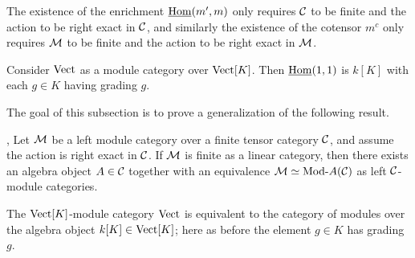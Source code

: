 \documentclass{amsart}
\begin{document}
\begin{remark} \label{rem-enrich}
	The existence of the enrichment $\operatorname{\underline{Hom}}(m', m)$ only requires $\mathcal C$ to be finite and the action to be right exact in $\mathcal C$, and similarly the existence of the cotensor $m^c$ only requires $\mathcal M$ to be finite and the action to be right exact in $\mathcal M$.
\end{remark}

\begin{example}
Consider $\mathrm{Vect}$ as a module category over $\mathrm{Vect}[K]$.  Then $\operatorname{\underline{Hom}}(1,1)$ is $k[K]$ with each $g \in K$ having grading $g$.
\end{example}



The goal of this subsection is to prove a generalization of the following result.   

\begin{theorem}{\cite[Thm 2.11.6]{EGNO}, \cite[Thm 1]{MR1976459}} \label{thm:EGNO2.11.6}
	Let $\mathcal M$ be a left module category over a finite tensor category $\mathcal C$, and assume the action is right exact in $\mathcal C$. If $\mathcal M$ is finite as a linear category, then there exists an algebra object $A \in \mathcal C$ together with an equivalence $\cM \simeq \Mod{}{A} (\cC)$ as left $\mathcal C$-module categories. 
\end{theorem}

\begin{example} \label{eg:vect}
The $\mathrm{Vect}[K]$-module category $\mathrm{Vect}$ is equivalent to the category of modules over the algebra object $k[K] \in \mathrm{Vect}[K]$; here as before the element $g \in K$ has grading $g$.  
\end{example}
\end{document}
